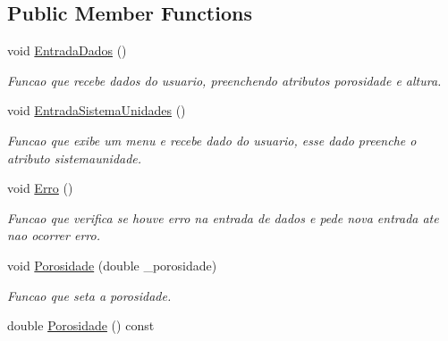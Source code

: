 \subsection*{Public Member Functions}
\begin{DoxyCompactItemize}
\item 
\hypertarget{classCReservatorio_af97e48ff5b4409f8e3f85751731373cd}{void \hyperlink{classCReservatorio_af97e48ff5b4409f8e3f85751731373cd}{Entrada\-Dados} ()}\label{classCReservatorio_af97e48ff5b4409f8e3f85751731373cd}

\begin{DoxyCompactList}\small\item\em Funcao que recebe dados do usuario, preenchendo atributos porosidade e altura. \end{DoxyCompactList}\item 
\hypertarget{classCReservatorio_aade83e0ca5f8a58bc20912377dc4b9ee}{void \hyperlink{classCReservatorio_aade83e0ca5f8a58bc20912377dc4b9ee}{Entrada\-Sistema\-Unidades} ()}\label{classCReservatorio_aade83e0ca5f8a58bc20912377dc4b9ee}

\begin{DoxyCompactList}\small\item\em Funcao que exibe um menu e recebe dado do usuario, esse dado preenche o atributo sistemaunidade. \end{DoxyCompactList}\item 
\hypertarget{classCReservatorio_a988c1fec6af707261b008e2f1ec74bea}{void \hyperlink{classCReservatorio_a988c1fec6af707261b008e2f1ec74bea}{Erro} ()}\label{classCReservatorio_a988c1fec6af707261b008e2f1ec74bea}

\begin{DoxyCompactList}\small\item\em Funcao que verifica se houve erro na entrada de dados e pede nova entrada ate nao ocorrer erro. \end{DoxyCompactList}\item 
\hypertarget{classCReservatorio_af50a6fd17a916fcb4835b263bb46d344}{void \hyperlink{classCReservatorio_af50a6fd17a916fcb4835b263bb46d344}{Porosidade} (double \-\_\-porosidade)}\label{classCReservatorio_af50a6fd17a916fcb4835b263bb46d344}

\begin{DoxyCompactList}\small\item\em Funcao que seta a porosidade. \end{DoxyCompactList}\item 
\hypertarget{classCReservatorio_a1f0524cd7b9439e2c13908658fcb5317}{double \hyperlink{classCReservatorio_a1f0524cd7b9439e2c13908658fcb5317}{Porosidade} () const }\label{classCReservatorio_a1f0524cd7b9439e2c13908658fcb5317}


\end{DoxyCompactItemize}
